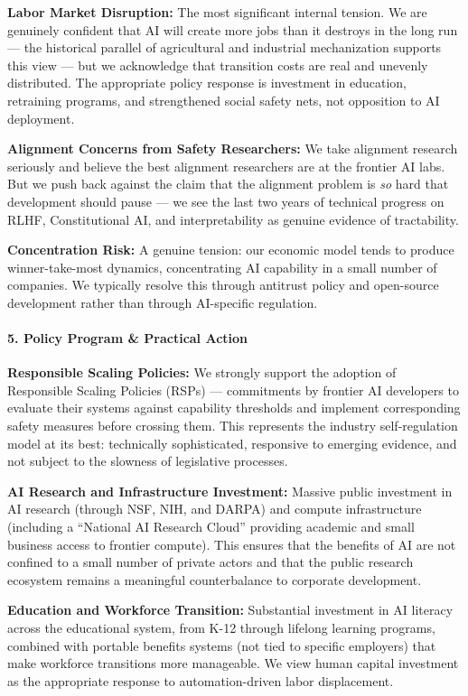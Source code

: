\textbf{Labor Market Disruption:} The most significant internal tension.
We are genuinely confident that AI will create more jobs than it
destroys in the long run --- the historical parallel of agricultural and
industrial mechanization supports this view --- but we acknowledge that
transition costs are real and unevenly distributed. The appropriate
policy response is investment in education, retraining programs, and
strengthened social safety nets, not opposition to AI deployment.

\textbf{Alignment Concerns from Safety Researchers:} We take alignment
research seriously and believe the best alignment researchers are at the
frontier AI labs. But we push back against the claim that the alignment
problem is \emph{so} hard that development should pause --- we see the
last two years of technical progress on RLHF, Constitutional AI, and
interpretability as genuine evidence of tractability.

\textbf{Concentration Risk:} A genuine tension: our economic model tends
to produce winner-take-most dynamics, concentrating AI capability in a
small number of companies. We typically resolve this through antitrust
policy and open-source development rather than through AI-specific
regulation.

\paragraph{5. Policy Program \& Practical
Action}\label{policy-program-practical-action-14}

\textbf{Responsible Scaling Policies:} We strongly support the adoption
of Responsible Scaling Policies (RSPs) --- commitments by frontier AI
developers to evaluate their systems against capability thresholds and
implement corresponding safety measures before crossing them. This
represents the industry self-regulation model at its best: technically
sophisticated, responsive to emerging evidence, and not subject to the
slowness of legislative processes.

\textbf{AI Research and Infrastructure Investment:} Massive public
investment in AI research (through NSF, NIH, and DARPA) and compute
infrastructure (including a ``National AI Research Cloud'' providing
academic and small business access to frontier compute). This ensures
that the benefits of AI are not confined to a small number of private
actors and that the public research ecosystem remains a meaningful
counterbalance to corporate development.

\textbf{Education and Workforce Transition:} Substantial investment in
AI literacy across the educational system, from K-12 through lifelong
learning programs, combined with portable benefits systems (not tied to
specific employers) that make workforce transitions more manageable. We
view human capital investment as the appropriate response to
automation-driven labor displacement.

